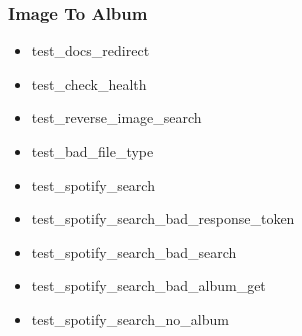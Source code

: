 \subsubsection{Image To Album}
\begin{multicols}{2}
    \begin{itemize}
        \item test\_docs\_redirect
        \item test\_check\_health
        \item test\_reverse\_image\_search
        \item test\_bad\_file\_type
        \item test\_spotify\_search
        \item test\_spotify\_search\_bad\_response\_token
        \item test\_spotify\_search\_bad\_search
        \item test\_spotify\_search\_bad\_album\_get
        \item test\_spotify\_search\_no\_album
    \end{itemize}
\end{multicols}

